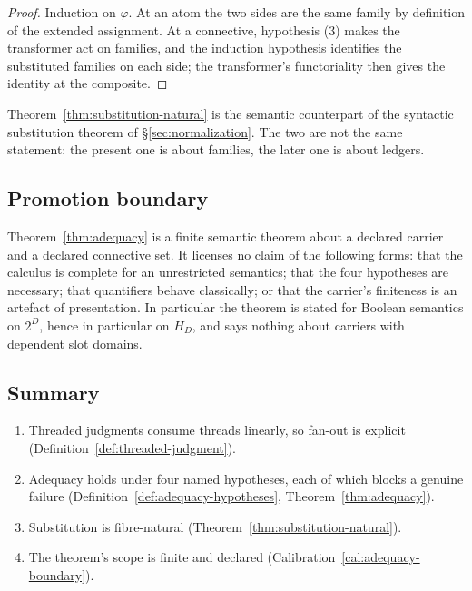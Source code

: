 \begin{proof}
Induction on $\varphi$.  At an atom the two sides are the same family by definition of the
extended assignment.  At a connective, hypothesis (3) makes the transformer act on families,
and the induction hypothesis identifies the substituted families on each side; the
transformer's functoriality then gives the identity at the composite.
\end{proof}

\begin{remark}
Theorem~\ref{thm:substitution-natural} is the semantic counterpart of the syntactic
substitution theorem of \S\ref{sec:normalization}.  The two are not the same statement:
the present one is about families, the later one is about ledgers.
\end{remark}

\subsection{Promotion boundary}

\begin{calibration}\label{cal:adequacy-boundary}
Theorem~\ref{thm:adequacy} is a finite semantic theorem about a declared carrier and a
declared connective set.  It licenses no claim of the following forms: that the calculus is
complete for an unrestricted semantics; that the four hypotheses are necessary; that
quantifiers behave classically; or that the carrier's finiteness is an artefact of
presentation.  In particular the theorem is stated for Boolean semantics on $2^{D}$, hence
in particular on $H_D$, and says nothing about carriers with dependent slot domains.
\end{calibration}

\subsection{Summary}

\begin{enumerate}
\item Threaded judgments consume threads linearly, so fan-out is explicit
  (Definition~\ref{def:threaded-judgment}).
\item Adequacy holds under four named hypotheses, each of which blocks a genuine failure
  (Definition~\ref{def:adequacy-hypotheses}, Theorem~\ref{thm:adequacy}).
\item Substitution is fibre-natural (Theorem~\ref{thm:substitution-natural}).
\item The theorem's scope is finite and declared
  (Calibration~\ref{cal:adequacy-boundary}).
\end{enumerate}
